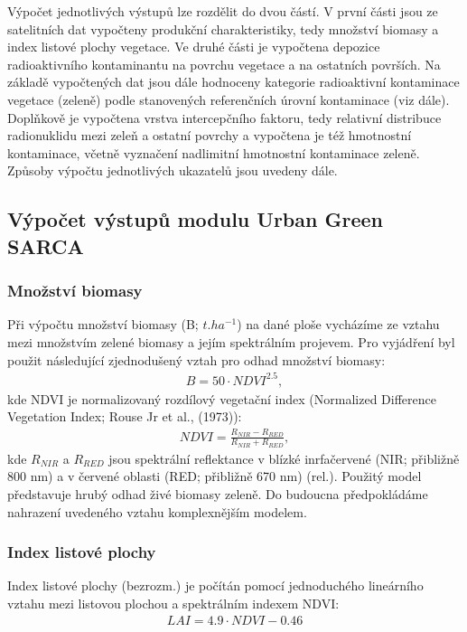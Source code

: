 \documentclass[letterpaper,10pt,english]{sphinxmanual}
\begin{document}
Výpočet jednotlivých výstupů lze rozdělit do dvou částí. V první části jsou
ze satelitních dat vypočteny produkční charakteristiky, tedy množství biomasy
a index listové plochy vegetace. Ve druhé části je vypočtena depozice
radioaktivního kontaminantu na povrchu vegetace a na ostatních površích. Na
základě vypočtených dat jsou dále hodnoceny kategorie radioaktivní
kontaminace vegetace (zeleně) podle stanovených referenčních úrovní
kontaminace (viz dále). Doplňkově je vypočtena vrstva intercepčního faktoru,
tedy relativní distribuce radionuklidu mezi zeleň a ostatní povrchy a
vypočtena je též hmotnostní kontaminace, včetně vyznačení nadlimitní
hmotnostní kontaminace zeleně. Způsoby výpočtu jednotlivých ukazatelů jsou
uvedeny dále.


\subsection{Výpočet výstupů modulu Urban Green SARCA}
\label{\detokenize{description:vypocet-vystupu-modulu-urban-green-sarca}}

\subsubsection{Množství biomasy}
\label{\detokenize{description:mnozstvi-biomasy}}
Při výpočtu množství biomasy (B; \(t.ha^{-1}\)) na dané ploše vycházíme ze
vztahu mezi množstvím zelené biomasy a jejím spektrálním projevem. Pro
vyjádření byl použit následující zjednodušený vztah pro odhad množství biomasy:
\begin{equation*}
\begin{split}B=50\cdot NDVI^{2.5},\end{split}
\end{equation*}
kde NDVI je normalizovaný rozdílový vegetační index (Normalized Difference
Vegetation Index; Rouse Jr et al., (1973)):
\begin{equation*}
\begin{split}NDVI=\frac{R_{NIR}-R_{RED}}{R_{NIR}+R_{RED}},\end{split}
\end{equation*}
kde \(R_{NIR}\) a \(R_{RED}\) jsou spektrální reflektance v blízké
inrfačervené (NIR; přibližně 800 nm) a v červené oblasti (RED; přibližně 670
nm) (rel.). Použitý model představuje hrubý odhad živé biomasy zeleně. Do
budoucna předpokládáme nahrazení uvedeného vztahu komplexnějším modelem.


\subsubsection{Index listové plochy}
\label{\detokenize{description:index-listove-plochy}}
Index listové plochy (bezrozm.) je počítán pomocí jednoduchého lineárního
vztahu mezi listovou plochou a spektrálním indexem NDVI:
\begin{equation*}
\begin{split}LAI=4.9\cdot NDVI-0.46\end{split}
\end{equation*}
\end{document}
